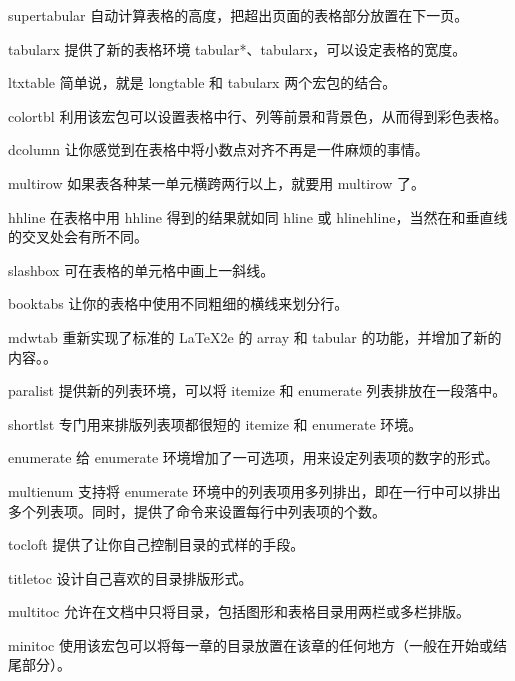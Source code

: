  
 
\usepackage{array} 
 
\usepackage{longtable}
 
supertabular 
自动计算表格的高度，把超出页面的表格部分放置在下一页。
 
tabularx 
提供了新的表格环境 tabular*、tabularx，可以设定表格的宽度。
 
ltxtable 
简单说，就是 longtable 和 tabularx 两个宏包的结合。
 
colortbl 
利用该宏包可以设置表格中行、列等前景和背景色，从而得到彩色表格。
 
dcolumn 
让你感觉到在表格中将小数点对齐不再是一件麻烦的事情。
 
multirow
如果表各种某一单元横跨两行以上，就要用 multirow 了。
 
hhline
在表格中用 hhline 得到的结果就如同 hline 或 hlinehline，当然在和垂直线的交叉处会有所不同。
 
slashbox
可在表格的单元格中画上一斜线。
 
booktabs
让你的表格中使用不同粗细的横线来划分行。
 
mdwtab
重新实现了标准的 LaTeX2e 的 array 和 tabular 的功能，并增加了新的内容。。
 
paralist
提供新的列表环境，可以将 itemize 和 enumerate 列表排放在一段落中。
 
shortlst
专门用来排版列表项都很短的 itemize 和 enumerate 环境。
 
enumerate
给 enumerate 环境增加了一可选项，用来设定列表项的数字的形式。
 
multienum
支持将 enumerate 环境中的列表项用多列排出，即在一行中可以排出多个列表项。同时，提供了命令来设置每行中列表项的个数。
 
tocloft
提供了让你自己控制目录的式样的手段。
 
titletoc
设计自己喜欢的目录排版形式。
 
multitoc
允许在文档中只将目录，包括图形和表格目录用两栏或多栏排版。
 
minitoc
使用该宏包可以将每一章的目录放置在该章的任何地方（一般在开始或结尾部分）。
 
